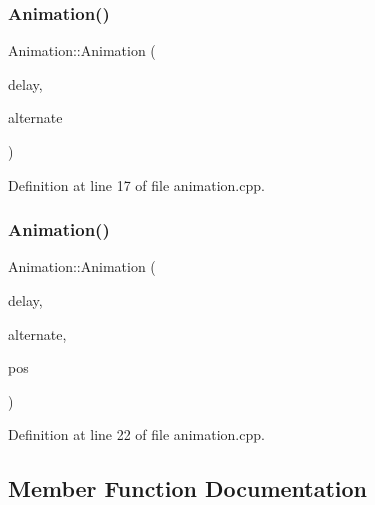 \mbox{\label{classns_game_1_1_animation_a022c8e1738aee4ce2e2c15abbeedc711}} 
\subsubsection{\texorpdfstring{Animation()}{Animation()}\hspace{0.1cm}{\footnotesize\ttfamily [3/4]}}
{\footnotesize\ttfamily Animation\+::\+Animation (\begin{DoxyParamCaption}\item[{unsigned}]{delay,  }\item[{bool}]{alternate }\end{DoxyParamCaption})}



Definition at line 17 of file animation.\+cpp.

\mbox{\label{classns_game_1_1_animation_a0170b0eeb1b1f41d4f0a5270877e9897}} 
\subsubsection{\texorpdfstring{Animation()}{Animation()}\hspace{0.1cm}{\footnotesize\ttfamily [4/4]}}
{\footnotesize\ttfamily Animation\+::\+Animation (\begin{DoxyParamCaption}\item[{unsigned}]{delay,  }\item[{bool}]{alternate,  }\item[{ns\+Graphics\+::\+Vec2D}]{pos }\end{DoxyParamCaption})}



Definition at line 22 of file animation.\+cpp.



\subsection{Member Function Documentation}
\mbox{\label{classns_game_1_1_animation_a348e25058d77891160c015da88ea4837}} 
